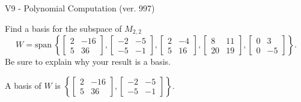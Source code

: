 \begin{exercise}
  \begin{exerciseTitle}V9 - Polynomial Computation (ver. 997)\end{exerciseTitle}
  \begin{exerciseStatement}
    Find a basis for the subspace of \(M_{2,2}\) 
\[W=\mathrm{span}\ \left\{\left[\begin{array}{cc}
2 & -16 \\
5 & 36
\end{array}\right] , \left[\begin{array}{cc}
-2 & -5 \\
-5 & -1
\end{array}\right] , \left[\begin{array}{cc}
2 & -4 \\
5 & 16
\end{array}\right] , \left[\begin{array}{cc}
8 & 11 \\
20 & 19
\end{array}\right] , \left[\begin{array}{cc}
0 & 3 \\
0 & -5
\end{array}\right]\right\}.\]
 Be sure to explain why your result is a basis.


  \end{exerciseStatement}
  \begin{exerciseAnswer}
   A basis of \(W\) is  \(\left\{\left[\begin{array}{cc}
2 & -16 \\
5 & 36
\end{array}\right] , \left[\begin{array}{cc}
-2 & -5 \\
-5 & -1
\end{array}\right]\right\}\).
  


  \end{exerciseAnswer}
\end{exercise}